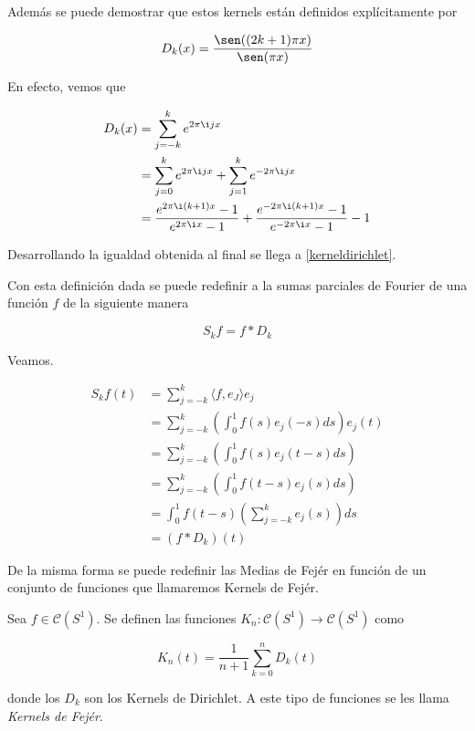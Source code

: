 Además se puede demostrar que estos kernels están definidos explícitamente por

\begin{equation}\label{kerneldirichlet}
D_k(x) = \frac{\sen ((2k+1)\pi x)}{\sen (\pi x)}
\end{equation}

En efecto, vemos que

\begin{align}
	D_k(x) &= \sum_{j=-k}^{k} e^{2\pi \i jx}\\
	&= \sum_{j=0}^{k} e^{2\pi \i jx} + \sum_{j=1}^{k} e^{-2\pi \i jx}\\
	&= \frac{e^{2\pi \i (k+1)x}-1}{e^{2\pi \i x} - 1} + \frac{e^{-2\pi \i (k+1)x}-1}{e^{-2\pi \i x} - 1} - 1
\end{align}

Desarrollando la igualdad obtenida al final se llega a \eqref{kerneldirichlet}.



Con esta definición dada se puede redefinir a la sumas parciales de Fourier de una función $f$ de la siguiente manera

\begin{equation}
	S_k f = f * D_k
\end{equation}

Veamos.

\begin{align}
	S_k f (t) &= \sum_{j=-k}^{k} \langle f,e_J \rangle e_j\\
	&= \sum_{j=-k}^{k} \left( \int_{0}^{1} f(s)e_j(-s)ds \right) e_j(t)\\
	&= \sum_{j=-k}^{k} \left( \int_{0}^{1} f(s) e_j(t-s)ds \right)\\
	&= \sum_{j=-k}^{k} \left( \int_{0}^{1} f(t-s) e_j(s) ds \right)\\
	&= \int_{0}^{1} f(t-s) \left( \sum_{j=-k}^{k} e_j (s) \right) ds\\
	&= (f * D_k)(t)
\end{align}

De la misma forma se puede redefinir las Medias de Fejér en función de un conjunto de funciones que llamaremos  Kernels de Fejér.

\begin{definicion}
	Sea $f \in \mathcal{C}(S^1)$. Se definen las funciones $K_n: \mathcal{C}(S^1) \rightarrow \mathcal{C}(S^1)$ como
	
	\begin{equation}
		K_n(t) = \frac{1}{n+1} \sum_{k=0}^{n} D_k(t)
	\end{equation} 
	
	donde los $D_k$ son los Kernels de Dirichlet. A este tipo de funciones se les llama \textit{Kernels de Fejér}.
\end{definicion}

